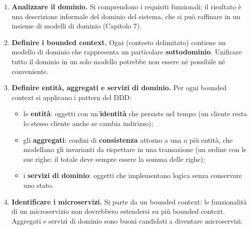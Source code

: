 \begin{enumerate}
  \item \textbf{Analizzare il dominio.} Si comprendono i requisiti funzionali; il risultato è una descrizione informale del
        dominio del sistema, che si può raffinare in un insieme di modelli di dominio (Capitolo 7).
  \item \textbf{Definire i bounded context.} Ogni  (contesto delimitato) contiene un modello di dominio
        che rappresenta un particolare \textbf{sottodominio}. Unificare tutto il dominio in un solo modello potrebbe non essere
        né possibile né conveniente.
  \item \textbf{Definire entità, aggregati e servizi di dominio.} Per ogni bounded context si applicano i pattern del DDD:
        \begin{itemize}
          \item le \textbf{entità}: oggetti con un'\textbf{identità} che persiste nel tempo (un cliente resta lo stesso
                cliente anche se cambia indirizzo);
          \item gli \textbf{aggregati}: confini di \textbf{consistenza} attorno a una o più entità, che modellano gli
                invarianti da rispettare in una transazione (un ordine con le sue righe: il totale deve sempre essere la
                somma delle righe);
          \item i \textbf{servizi di dominio}: oggetti che implementano logica senza conservare uno stato.
        \end{itemize}
  \item \textbf{Identificare i microservizi.} Si parte da un bounded context: le funzionalità di un microservizio non
        dovrebbero estendersi su più bounded context. Aggregati e servizi di dominio sono buoni candidati a diventare
        microservizi.
\end{enumerate}

